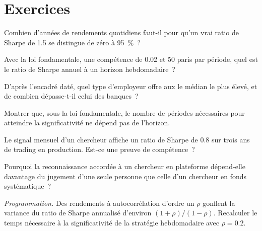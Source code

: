 \section{Exercices}

\begin{exercise}[$\star$]\label{exo:in:quant-researcher:1}
Combien d'années de rendements quotidiens faut-il pour qu'un vrai ratio de Sharpe de 1.5 se distingue de zéro à 95~\%~?
\end{exercise}

\begin{exercise}[$\star$]\label{exo:in:quant-researcher:2}
Avec la loi fondamentale, une compétence de 0.02 et 50 paris par période, quel est le ratio de Sharpe annuel à un horizon hebdomadaire~?
\end{exercise}

\begin{exercise}[$\star$]\label{exo:in:quant-researcher:3}
D'après l'encadré daté, quel type d'employeur offre aux  le  médian le plus élevé, et de
combien dépasse-t-il celui des banques~?
\end{exercise}

\begin{exercise}[$\star\star$]\label{exo:in:quant-researcher:4}
Montrer que, sous la loi fondamentale, le nombre de périodes nécessaires pour atteindre la significativité ne dépend pas de l'horizon.
\end{exercise}

\begin{exercise}[$\star\star$]\label{exo:in:quant-researcher:5}
Le signal mensuel d'un chercheur affiche un ratio de Sharpe de 0.8 sur trois ans de trading en production. Est-ce une preuve de compétence~?
\end{exercise}

\begin{exercise}[$\star\star$]\label{exo:in:quant-researcher:6}
Pourquoi la reconnaissance accordée à un chercheur en plateforme dépend-elle davantage du jugement d'une seule personne que celle d'un chercheur en fonds systématique~?
\end{exercise}

\begin{exercise}[$\star\star\star$]\label{exo:in:quant-researcher:7}
\emph{Programmation.} Des rendements à autocorrélation d'ordre un $\rho$ gonflent la variance du ratio de Sharpe annualisé
d'environ $(1+\rho)/(1-\rho)$. Recalculer le temps nécessaire à la significativité de la stratégie hebdomadaire avec $\rho=0.2$.
\end{exercise}

